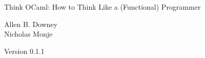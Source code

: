 \documentclass[10pt]{book}
\newcommand{\thetitle}{Think OCaml: How to Think Like a (Functional) Programmer}
\newcommand{\theversion}{0.1.1}
\begin{document}

\begin{htmlonly}


{\Large \thetitle}

{\large Allen B. Downey\\}
{\small Nicholas Monje\\}

Version \theversion

\setcounter{chapter}{-1}

\end{htmlonly}












\end{document}
